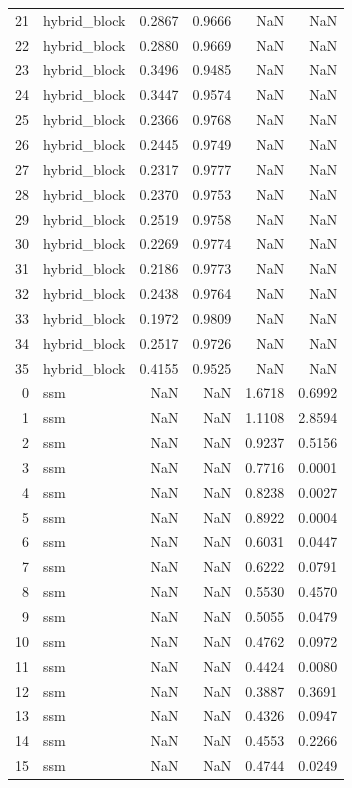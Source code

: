 \begin{tabular}{rlrrrr}
21 & hybrid_block & 0.2867 & 0.9666 & NaN & NaN \\
22 & hybrid_block & 0.2880 & 0.9669 & NaN & NaN \\
23 & hybrid_block & 0.3496 & 0.9485 & NaN & NaN \\
24 & hybrid_block & 0.3447 & 0.9574 & NaN & NaN \\
25 & hybrid_block & 0.2366 & 0.9768 & NaN & NaN \\
26 & hybrid_block & 0.2445 & 0.9749 & NaN & NaN \\
27 & hybrid_block & 0.2317 & 0.9777 & NaN & NaN \\
28 & hybrid_block & 0.2370 & 0.9753 & NaN & NaN \\
29 & hybrid_block & 0.2519 & 0.9758 & NaN & NaN \\
30 & hybrid_block & 0.2269 & 0.9774 & NaN & NaN \\
31 & hybrid_block & 0.2186 & 0.9773 & NaN & NaN \\
32 & hybrid_block & 0.2438 & 0.9764 & NaN & NaN \\
33 & hybrid_block & 0.1972 & 0.9809 & NaN & NaN \\
34 & hybrid_block & 0.2517 & 0.9726 & NaN & NaN \\
35 & hybrid_block & 0.4155 & 0.9525 & NaN & NaN \\
0 & ssm & NaN & NaN & 1.6718 & 0.6992 \\
1 & ssm & NaN & NaN & 1.1108 & 2.8594 \\
2 & ssm & NaN & NaN & 0.9237 & 0.5156 \\
3 & ssm & NaN & NaN & 0.7716 & 0.0001 \\
4 & ssm & NaN & NaN & 0.8238 & 0.0027 \\
5 & ssm & NaN & NaN & 0.8922 & 0.0004 \\
6 & ssm & NaN & NaN & 0.6031 & 0.0447 \\
7 & ssm & NaN & NaN & 0.6222 & 0.0791 \\
8 & ssm & NaN & NaN & 0.5530 & 0.4570 \\
9 & ssm & NaN & NaN & 0.5055 & 0.0479 \\
10 & ssm & NaN & NaN & 0.4762 & 0.0972 \\
11 & ssm & NaN & NaN & 0.4424 & 0.0080 \\
12 & ssm & NaN & NaN & 0.3887 & 0.3691 \\
13 & ssm & NaN & NaN & 0.4326 & 0.0947 \\
14 & ssm & NaN & NaN & 0.4553 & 0.2266 \\
15 & ssm & NaN & NaN & 0.4744 & 0.0249 \\

\end{tabular}
